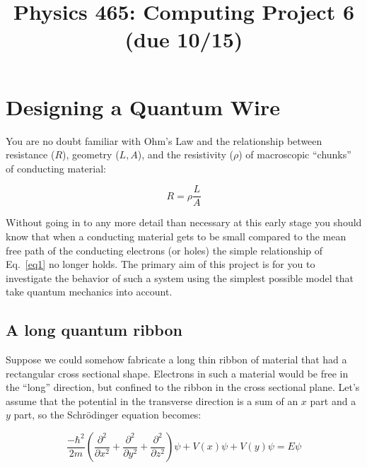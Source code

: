 \documentclass[11pt]{article} %
\title{Physics 465: Computing Project 6 (due 10/15)}
\begin{document}
\maketitle

\section*{Designing a Quantum Wire}

You are no doubt familiar with Ohm's Law and the relationship between resistance ($R$), geometry ($L, A$), and the resistivity ($\rho$) of  macroscopic ``chunks'' of conducting material:

\begin{equation}
R = \rho \frac{L}{A}
\label{eq1}
\end{equation}

Without going in to any more detail than necessary at this early stage you should know that when a conducting material gets to be small compared to the mean free path of the conducting electrons (or holes) the simple relationship of Eq.~\ref{eq1} no longer holds. The primary aim of this project is for you to investigate the behavior of such a system using the simplest possible model that take quantum mechanics into account. 



\subsection*{A long quantum ribbon}

Suppose we could somehow fabricate a long thin ribbon of material that had a rectangular cross sectional shape. Electrons in such a material would be free in the ``long'' direction, but confined to the ribbon in the cross sectional plane. Let's assume that the potential in the transverse direction is a sum of an $x$ part and a $y$ part, so the Schr\"odinger equation becomes:

\begin{equation}
\frac{-\hbar^2}{2m}(\frac{\partial^2}{\partial x^2} + \frac{\partial^2}{\partial y^2} + \frac{\partial^2}{\partial z^2})\psi + V(x)\psi + V(y)\psi = E\psi
\label{eq2}
\end{equation}
\end{document}
